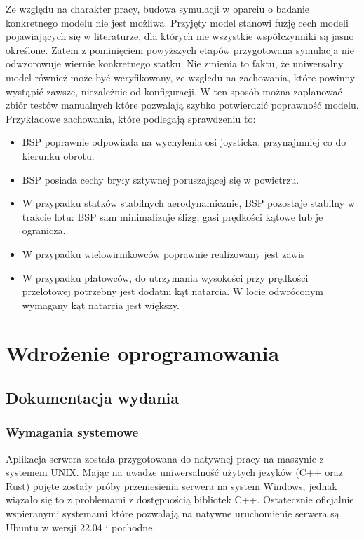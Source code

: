 \documentclass[15pt]{sprawozdanie}
\begin{document}
Ze względu na charakter pracy, budowa symulacji w oparciu o badanie konkretnego modelu nie jest możliwa. Przyjęty model stanowi fuzję cech modeli pojawiających się w literaturze, dla których nie wszystkie współczynniki są jasno określone. Zatem z pominięciem powyższych etapów przygotowana symulacja nie odwzorowuje wiernie konkretnego statku. Nie zmienia to faktu, że uniwersalny model również może być weryfikowany, ze wzgledu na zachowania, które powinny wystąpić zawsze, niezależnie od konfiguracji. W ten sposób można zaplanować zbiór testów manualnych które pozwalają szybko potwierdzić poprawność modelu. Przykładowe zachowania, które podlegają sprawdzeniu to:
\begin{itemize}[noitemsep]
\item BSP poprawnie odpowiada na wychylenia osi joysticka, przynajmniej co do kierunku obrotu.
\item BSP posiada cechy bryły sztywnej poruszającej się w powietrzu.
\item W przypadku statków stabilnych aerodynamicznie, BSP pozostaje stabilny w trakcie lotu: BSP sam minimalizuje ślizg, gasi prędkości kątowe lub je ogranicza.
\item W przypadku wielowirnikowców poprawnie realizowany jest zawis
\item W przypadku płatowców, do utrzymania wysokości przy prędkości przelotowej potrzebny jest dodatni kąt natarcia. W locie odwróconym wymagany kąt natarcia jest większy.
\end{itemize}


\newpage
\section{Wdrożenie oprogramowania}
\subsection{Dokumentacja wydania}
\subsubsection{Wymagania systemowe}
Aplikacja serwera została przygotowana do natywnej pracy na maszynie z systemem UNIX. Mając na uwadze uniwersalność użytych jezyków (C++ oraz Rust) pojęte zostały próby przeniesienia serwera na system Windows, jednak wiązało się to z problemami z dostępnością bibliotek C++. Ostatecznie oficjalnie wspieranymi systemami które pozwalają na natywne uruchomienie serwera są Ubuntu w wersji 22.04 i pochodne. \\
\end{document}
